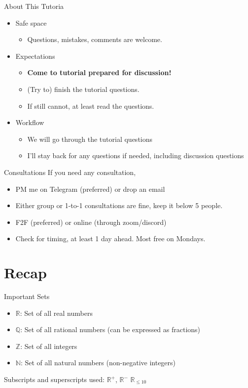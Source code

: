 \documentclass[10pt]{beamer}
\begin{document}
\begin{frame}[fragile]{About This Tutoria}
\begin{itemize}
  \item Safe space
  \begin{itemize}
    \item Questions, mistakes, comments are welcome.
  \end{itemize}
  \item Expectations
  \begin{itemize}
    \item \textbf{Come to tutorial prepared for discussion!}
    \item (Try to) finish the tutorial questions.
    \item If still cannot, at least read the questions. 
  \end{itemize}
  \item Workflow
  \begin{itemize}
    \item We will go through the tutorial questions
    \item I'll stay back for any questions if needed, including discussion questions
  \end{itemize}
\end{itemize} 
\end{frame}


\begin{frame}[fragile]{Consultations}
If you need any consultation,
  \begin{itemize}
    \item PM me on Telegram (preferred) or drop an email
    \item Either group or 1-to-1 consultations are fine, keep it below 5 people.
    \item F2F (preferred) or online (through zoom/discord)
    \item Check for timing, at least 1 day ahead. Most free on Mondays.
  \end{itemize}
\end{frame}

\section[Recap]{Recap}

\begin{frame}[fragile]{Important Sets}
  \begin{itemize}
    \item $\mathbb{R}$: Set of all real numbers
    \item $\mathbb{Q}$: Set of all rational numbers (can be expressed as fractions)
    \item $\mathbb{Z}$: Set of all integers
    \item $\mathbb{N}$: Set of all natural numbers (non-negative integers)
  \end{itemize}
  Subscripts and superscripts used: ${\mathbb{R}}^+$, ${\mathbb{R}}^-$ ${\mathbb{R}}_{\leq 10}$
\end{frame}
\end{document}
